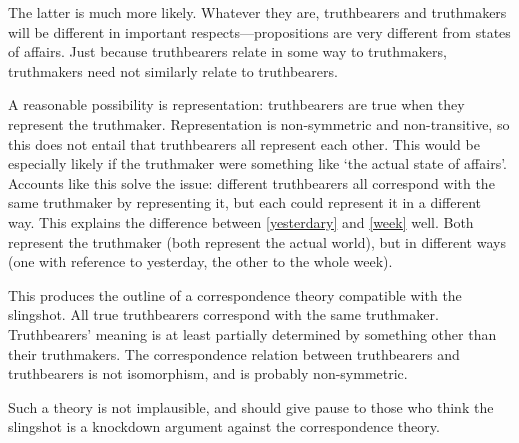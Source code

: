The latter is much more likely.
Whatever they are, truthbearers and truthmakers will be different in important respects---propositions are very different from states of affairs.
Just because truthbearers relate in some way to truthmakers, truthmakers need not similarly relate to truthbearers.

A reasonable possibility is representation: truthbearers are true when they represent the truthmaker.
Representation is non-symmetric and non-transitive, so this does not entail that truthbearers all represent each other.
This would be especially likely if the truthmaker were something like `the actual state of affairs'.
Accounts like this solve the issue: different truthbearers all correspond with the same truthmaker by representing it, but each could represent it in a different way.
This explains the difference between \ref{yesterdary} and \ref{week} well.
Both represent the truthmaker (both represent the actual world), but in different ways (one with reference to yesterday, the other to the whole week).

This produces the outline of a correspondence theory compatible with the slingshot.
All true truthbearers correspond with the same truthmaker.
Truthbearers' meaning is at least partially determined by something other than their truthmakers.
The correspondence relation between truthbearers and truthbearers is not isomorphism, and is probably non-symmetric.

Such a theory is not implausible, and should give pause to those who think the slingshot is a knockdown argument against the correspondence theory.
